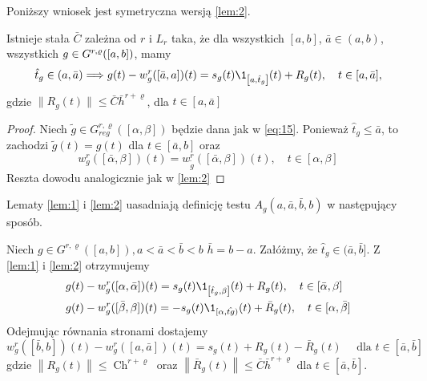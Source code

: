 \documentclass[oik, pdftex, robocza, man]{mgrwms}
\begin{document}
    Poniższy wniosek jest symetryczna wersją \eqref{lem:2}.

    \begin{cor}
        Istnieje stała $\bar{C}$ zależna od $r$ i $L_{r}$ taka, że dla wszystkich $[a,b]$, $\bar{a} \in (a,b)$, wszystkich $g \in G^{r,\varrho}([a,b])$, mamy
        \begin{equation*}
            \hat{t}_{g} \in (a,\bar{a}) \Longrightarrow g(t)-w_{g}^{r}([\bar{a},a])(t)=s_{g}(t) \1_{\left[a,\hat{t}_{g}\right]}(t)+R_{g}(t), \quad t \in[a,\bar{a}],
        \end{equation*}
        gdzie $\| R_{g}(t) \| \leq \bar{C}\bar{h}^{r+\varrho}$, dla $t \in [a,\bar{a}]$
    \end{cor}
    \begin{proof}
        Niech $\tilde{g} \in G_{reg}^{r, \varrho}([\alpha, \beta])$ będzie dana jak w \eqref{eq:15}. Ponieważ $\hat{t}_{g} \leq \bar{a}$, to zachodzi $\tilde{g}(t)=g(t)$ dla $t \in[\bar{a}, b]$ oraz
        \begin{equation*}
            w_{g}^{r}([\bar{\alpha}, \beta])(t)=w_{\tilde{g}}^{r}([\bar{\alpha}, \beta])(t), \quad t \in[\alpha, \beta]
        \end{equation*}
        Reszta dowodu analogicznie jak w \eqref{lem:2}
    \end{proof}

    Lematy \eqref{lem:1} i \eqref{lem:2} uasadniają definicję testu $A_{g}(a, \bar{a}, \bar{b}, b)$ w następujący sposób.

    Niech $g \in G^{r, \varrho}([a,b]), a<\bar{a}<\bar{b}<b$ $\bar{h}=b-a$. Załóżmy, że $\hat{t}_{g} \in(\bar{a}, \bar{b}]$. Z \eqref{lem:1} i \eqref{lem:2} otrzymujemy
    \begin{equation*}
        \begin{aligned}
            &g(t)-w_{g}^{r}([\alpha, \bar{\alpha}])(t)=s_{g}(t) \1_{\left[\hat{t}_{g}, \beta\right]}(t)+R_{g}(t), \quad t \in[\bar{\alpha}, \beta] \\
            &g(t)-w_{g}^{r}([\bar{\beta}, \beta])(t)=-s_{g}(t) \1_{[\alpha, \hat{t g})}(t)+\bar{R}_{g}(t), \quad t \in[\alpha, \bar{\beta}]
        \end{aligned}
    \end{equation*}
    Odejmując równania stronami dostajemy
    \begin{equation} \label{eq:16}
        w_{g}^{r}([\bar{b}, b])(t)-w_{g}^{r}([a, \bar{a}])(t)=s_{g}(t)+R_{g}(t)-\bar{R}_{g}(t) \quad \text{ dla }t \in[\bar{a}, \bar{b}]
    \end{equation}
    gdzie $\left\|R_{g}(t)\right\| \leq \operatorname{Ch}^{r+\varrho}$ oraz $\left\|\bar{R}_{g}(t)\right\| \leq \bar{C} \bar{h}^{r+\varrho}$ dla $t \in[\bar{a}, \bar{b}]$.
\end{document}
